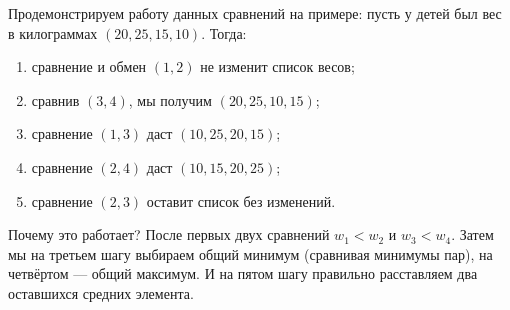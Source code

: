 \begin{itemize}
\begin{center}\end{center}

Продемонстрируем работу данных сравнений на примере: пусть у детей был вес в килограммах
$(20,25,15,10)$. Тогда:
\begin{enumerate}
\item сравнение и обмен $(1,2)$ не изменит список весов;
\item сравнив $(3,4)$, мы получим $(20,25,10,15)$;
\item сравнение $(1,3)$ даст $(10,25,20,15)$;
\item сравнение $(2,4)$ даст $(10,15,20,25)$;
\item сравнение $(2,3)$ оставит список без изменений.
\end{enumerate}

Почему это работает? После первых двух сравнений $w_1 < w_2$
и $w_3 < w_4$. Затем мы на третьем шагу выбираем общий минимум 
(сравнивая минимумы пар), на четвёртом --- общий максимум. 
И на пятом шагу правильно расставляем два оставшихся средних элемента.

\end{itemize}
